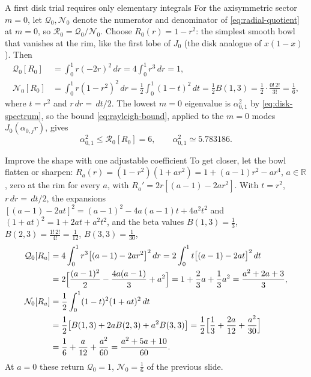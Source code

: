 \documentclass[11pt]{beamer}
\newcommand{\dd}{\,d}
\newcommand{\Q}{\mathcal Q}
\newcommand{\N}{\mathcal N}
\newcommand{\R}{\mathcal R}
\begin{document}
\begin{frame}{A first disk trial requires only elementary integrals}
\small
For the axisymmetric sector $m=0$, let $\Q_0,\N_0$ denote the numerator and denominator
of \eqref{eq:radial-quotient} at $m=0$, so $\R_0=\Q_0/\N_0$. Choose $R_0(r)=1-r^2$:
the simplest smooth bowl that vanishes at the rim, like the first lobe of $J_0$
(the disk analogue of $x(1-x)$). Then
\begin{align*}
 \Q_0[R_0]&=\int_0^1r(-2r)^2\dd r=4\int_0^1r^3\dd r=1,\\
 \N_0[R_0]&=\int_0^1r(1-r^2)^2\dd r
     =\frac12\int_0^1(1-t)^2\dd t
     =\frac12B(1,3)=\frac12\cdot\frac{0!\,2!}{3!}=\frac16,
\end{align*}
where $t=r^2$ and $r\dd r=\dd t/2$.
The lowest $m=0$ eigenvalue is $\alpha_{0,1}^2$ by \eqref{eq:disk-spectrum}, so the
bound \eqref{eq:rayleigh-bound}, applied to the $m=0$ modes $J_0(\alpha_{0,j}r)$, gives
\[
 \alpha_{0,1}^2\le\R_0[R_0]=6,
 \qquad \alpha_{0,1}^2\simeq5.783186.
\]
\end{frame}

\begin{frame}{Improve the shape with one adjustable coefficient}
\small
To get closer, let the bowl flatten or sharpen: $R_a(r)=(1-r^2)(1+ar^2)=1+(a-1)r^2-ar^4$,
$a\in\mathbb R$, zero at the rim for every $a$, with $R_a'=2r[(a-1)-2ar^2]$.
With $t=r^2$, $r\dd r=\dd t/2$, the expansions
$[(a-1)-2at]^2=(a-1)^2-4a(a-1)t+4a^2t^2$ and $(1+at)^2=1+2at+a^2t^2$, and the
beta values $B(1,3)=\frac13$, $B(2,3)=\frac{1!\,2!}{4!}=\frac1{12}$, $B(3,3)=\frac1{30}$,
\begin{align*}
 \Q_0[R_a]
 &=4\int_0^1r^3\bigl[(a-1)-2ar^2\bigr]^2\dd r
   =2\int_0^1t\bigl[(a-1)-2at\bigr]^2\dd t\\
 &=2\Bigl[\frac{(a-1)^2}{2}-\frac{4a(a-1)}{3}+a^2\Bigr]
   =1+\frac23a+\frac13a^2=\frac{a^2+2a+3}{3},\\
 \N_0[R_a]
 &=\frac12\int_0^1(1-t)^2(1+at)^2\dd t\\
 &=\frac12\bigl[B(1,3)+2aB(2,3)+a^2B(3,3)\bigr]
   =\frac12\Bigl[\frac13+\frac{2a}{12}+\frac{a^2}{30}\Bigr]\\
 &=\frac16+\frac{a}{12}+\frac{a^2}{60}=\frac{a^2+5a+10}{60}.
\end{align*}
At $a=0$ these return $\Q_0=1$, $\N_0=\frac16$ of the previous slide.
\end{frame}
\end{document}
